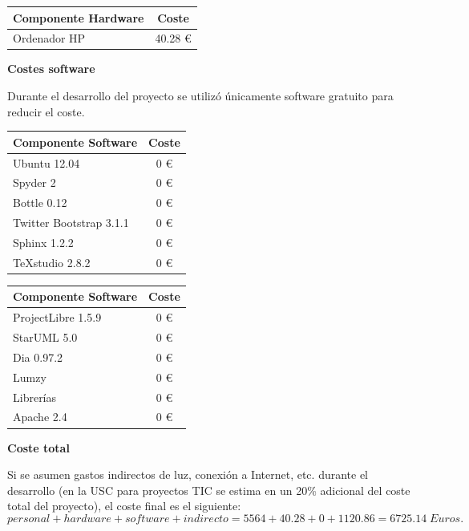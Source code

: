 \begin{table}[H]
	\centering
	\begin{tabular}{|l|c|}
		\hline
		\textbf{Componente Hardware} & \textbf{Coste} \\ \hline
		Ordenador HP & 40.28 \euro \\ \hline
	\end{tabular}
\end{table}

\noindent
\textbf{Costes software}

Durante el desarrollo del proyecto se utilizó únicamente software gratuito para reducir el coste.

\begin{table}[H]
	\centering
	\begin{tabular}{|l|c|}
		\hline
		\textbf{Componente Software} & \textbf{Coste} \\ \hline
		Ubuntu 12.04 & 0 \euro \\ \hline
		Spyder 2 & 0 \euro \\ \hline
		Bottle 0.12 & 0 \euro \\ \hline
		Twitter Bootstrap 3.1.1 & 0 \euro \\ \hline
		Sphinx 1.2.2 & 0 \euro \\ \hline
		TeXstudio 2.8.2 & 0 \euro \\ \hline
	\end{tabular}
	\quad
	\begin{tabular}{|l|c|}
		\hline
		\textbf{Componente Software} & \textbf{Coste} \\ \hline
		ProjectLibre 1.5.9 & 0 \euro \\ \hline
		StarUML 5.0 & 0 \euro \\ \hline
		Dia 0.97.2 & 0 \euro \\ \hline
		Lumzy & 0 \euro \\ \hline
		Librerías & 0 \euro \\ \hline
		Apache 2.4 & 0 \euro \\ \hline
	\end{tabular}
\end{table}

\noindent
\textbf{Coste total}

Si se asumen gastos indirectos de luz, conexión a Internet, etc. durante el desarrollo (en la USC para proyectos TIC se estima en un 20\% adicional del coste total del proyecto), el coste final es el siguiente:
\[ personal + hardware + software + indirecto = 5564 + 40.28 + 0 + 1120.86 = 6725.14 \; Euros. \]